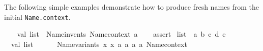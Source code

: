 \begin{isabellebody}
\begin{isamarkuptext}
\begin{description}
  \end{description}%
\end{isamarkuptext}%
\isamarkuptrue%
%
\endisatagmlref
{\isafoldmlref}%
%
\isadelimmlref
%
\endisadelimmlref
%
\isadelimmlex
%
\endisadelimmlex
%
\isatagmlex
%
\begin{isamarkuptext}%
The following simple examples demonstrate how to produce
  fresh names from the initial \verb|Name.context|.%
\end{isamarkuptext}%
\isamarkuptrue%
%
\endisatagmlex
{\isafoldmlex}%
%
\isadelimmlex
%
\endisadelimmlex
%
\isadelimML
%
\endisadelimML
%
\isatagML
{}\isamarkupfalse%
\ {}\isanewline
\ \ val\ list{}\ {}\ Name{}invents\ Name{}context\ {}a{}\ {}{}\isanewline
\ \ %
\isaantiq
assert{}%
\endisaantiq
\ {}list{}\ {}\ {}{}a{}{}\ {}b{}{}\ {}c{}{}\ {}d{}{}\ {}e{}{}{}{}\isanewline
\isanewline
\ \ val\ list{}\ {}\isanewline
\ \ \ \ {}{}\ {}Name{}variants\ {}{}x{}{}\ {}x{}{}\ {}a{}{}\ {}a{}{}\ {}{}a{}{}\ {}{}a{}{}\ Name{}context{}{}\isanewline

\end{isabellebody}
